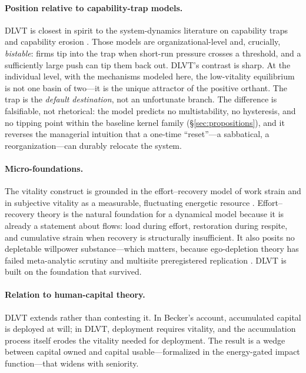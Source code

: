 \paragraph{Position relative to capability-trap models.}
DLVT is closest in spirit to the system-dynamics literature on capability
traps and capability erosion
\citep{repenning2002capability,repenning2002simulation,rahmandad2016capability,sterman2000business}.
Those models are organizational-level and, crucially, \emph{bistable}:
firms tip into the trap when short-run pressure crosses a threshold, and a
sufficiently large push can tip them back out. DLVT's contrast is sharp. At
the individual level, with the mechanisms modeled here, the low-vitality
equilibrium is not one basin of two---it is the unique attractor of the
positive orthant. The trap is the \emph{default destination}, not an
unfortunate branch. The difference is falsifiable, not rhetorical: the
model predicts no multistability, no hysteresis, and no tipping point
within the baseline kernel family (\S\ref{sec:propositions}), and it
reverses the managerial intuition that a one-time ``reset''---a
sabbatical, a reorganization---can durably relocate the system.

\paragraph{Micro-foundations.}
The vitality construct is grounded in the effort--recovery model of work
strain \citep{meijman1998effort} and in subjective vitality as a
measurable, fluctuating energetic resource
\citep{ryan1997subjective,nix1999revitalization,quinn2012humanenergy}.
Effort--recovery theory is the natural foundation for a dynamical model
because it is already a statement about flows: load during effort,
restoration during respite, and cumulative strain when recovery is
structurally insufficient. It also posits no depletable willpower
substance---which matters, because ego-depletion theory
\citep{baumeister1998ego} has failed meta-analytic scrutiny and multisite
preregistered replication
\citep{hagger2010ego,carter2015series,vohs2021multisite}. DLVT is built on
the foundation that survived.

\paragraph{Relation to human-capital theory.}
DLVT extends \citet{becker1993human} rather than contesting it. In Becker's
account, accumulated capital is deployed at will; in DLVT, deployment
requires vitality, and the accumulation process itself erodes the vitality
needed for deployment. The result is a wedge between capital owned and
capital usable---formalized in the energy-gated impact function---that
widens with seniority.

